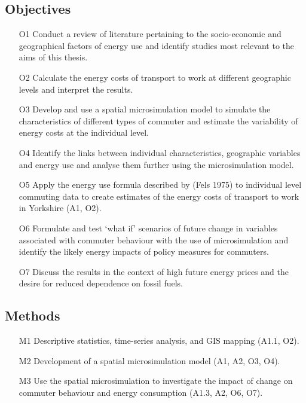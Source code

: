 \documentclass[a4paper, 11pt, twoside]{Thesis}
\begin{document}
\subsection{Objectives}
\begin{itemize}
 \item[O1] Conduct a review of literature pertaining to the socio-economic and
geographical factors of
energy use and identify studies most relevant to the aims of this thesis.
  \item[O2]Calculate the energy costs of transport to work at different
geographic levels and interpret the results.
  \item[O3]Develop and use a spatial microsimulation model to simulate the
characteristics of different types of commuter and estimate the variability of
energy costs at the individual level.
  \item[O4] Identify the links between individual characteristics, geographic
variables and energy use
and analyse them further using the microsimulation model.
  \item[O5]Apply the energy use formula described by (Fels 1975) to individual
level commuting data to create estimates of the energy costs of transport to
work in Yorkshire (A1, O2).
  \item[O6] Formulate and test `what if' scenarios of future change in
variables
associated with commuter behaviour with the use of microsimulation and identify
the likely energy impacts of policy measures for commuters.
  \item[O7]Discuss the results in the context of high future energy prices and
the desire for reduced dependence on fossil fuels.
\end{itemize}

\subsection{Methods}
\begin{itemize}
 \item[M1] Descriptive statistics, time-series analysis, and GIS mapping (A1.1,
O2).
\item[M2]Development of a spatial microsimulation model (A1, A2, O3, O4).
\item[M3]Use the spatial microsimulation to investigate the impact of
change on commuter behaviour and energy consumption (A1.3, A2, O6, O7).
\end{itemize}
\end{document}
